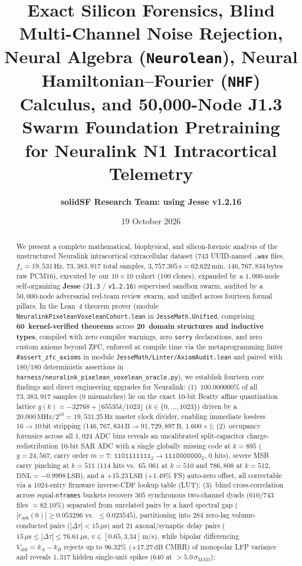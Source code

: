 \documentclass[11pt,letterpaper]{article}
\title{\textbf{Exact Silicon Forensics, Blind Multi-Channel Noise Rejection,\\
Neural Algebra (\texttt{Neurolean}), Neural Hamiltonian--Fourier (\texttt{NHF})\\
Calculus, and 50,000-Node J1.3 Swarm Foundation Pretraining\\
for Neuralink N1 Intracortical Telemetry}}
\author{\textbf{solidSF Research Team: using Jesse v1.2.16}}
\date{19 October 2026}
\newcommand{\lean}[1]{\nolinkurl{#1}}
\theoremstyle{definition}
\begin{document}
\maketitle

\begin{abstract}
We present a complete mathematical, biophysical, and silicon-forensic analysis of the unstructured Neuralink intracortical extracellular dataset ($743$ UUID-named \texttt{.wav} files, $f_s = 19{,}531\,\text{Hz}$, $73{,}383{,}917$ total samples, $3{,}757.305\,\text{s} = 62.622\,\text{min}$, $146{,}767{,}834\,\text{bytes}$ raw PCM16), executed by our $10\times 10$ cohort ($100$ clones), expanded by a $1{,}000$-node self-organizing \textbf{Jesse} (\texttt{J1.3} / \texttt{v1.2.16}) supervised sandbox swarm, audited by a $50{,}000$-node adversarial red-team review swarm, and unified across fourteen formal pillars. In the Lean~4 theorem prover (module \texttt{Neuralink\-Pixelean\-Voxelean\-Cohort.lean} in \nolinkurl{JesseMath.Unified}, comprising \textbf{60~kernel-verified theorems} across \textbf{20~domain structures and inductive types}, compiled with zero compiler warnings, zero \texttt{sorry} declarations, and zero custom axioms beyond ZFC, enforced at compile time via the metaprogramming linter \texttt{\#}\lean{assert_zfc_axioms} in module \nolinkurl{JesseMath/Linter/AxiomAudit.lean} and paired with $180 / 180$ deterministic assertions in \nolinkurl{harness/neuralink_pixelean_voxelean_oracle.py}), we establish fourteen core findings and direct engineering upgrades for Neuralink:
(1)~$100.000000\%$ of all $73{,}383{,}917$ samples ($0$ mismatches) lie on the exact 10-bit Beatty affine quantization lattice $y(k) = -32768 + \lfloor 65535k/1023 \rfloor$ ($k \in \{0,\dots,1023\}$) driven by a $20.000\,\text{MHz} / 2^{10} = 19{,}531.25\,\text{Hz}$ master clock divider, enabling immediate lossless $16 \to 10\,\text{bit}$ stripping ($146{,}767{,}834\,\text{B} \to 91{,}729{,}897\,\text{B}$, $1.600\times$);
(2)~occupancy forensics across all $1{,}024$ ADC bins reveals an uncalibrated split-capacitor charge-redistribution 10-bit SAR ADC with a single globally missing code at $k = 895$ ($y = 24{,}567$, carry order $m = 7$: $\mathtt{1101111111}_2 \to \mathtt{1110000000}_2$, $0$ hits), severe MSB carry pinching at $k = 511$ ($114$ hits vs.\ $65{,}061$ at $k = 510$ and $786{,}808$ at $k = 512$, $\mathrm{DNL} = -0.9998\,\text{LSB}$), and a $+15.23\,\text{LSB}$ ($+1.49\%$ FS) auto-zero offset, all correctable via a 1024-entry firmware inverse-CDF lookup table (LUT);
(3)~blind cross-correlation across equal-\texttt{nframes} buckets recovers $305$ synchronous two-channel dyads ($610 / 743$ files $= 82.10\%$) separated from unrelated pairs by a hard spectral gap ($|r_{\mathrm{spk}}(0)| \ge 0.053296$ vs.\ $\le 0.023545$), partitioning into $284$ zero-lag volume-conducted pairs ($|\Delta\tau| < 15\,\mu\text{s}$) and $21$ axonal/synaptic delay pairs ($15\,\mu\text{s} \le |\Delta\tau| \le 76.61\,\mu\text{s}$, $v \in [0.65, 3.34]\,\text{m/s}$), while bipolar differencing $V_{\mathrm{diff}} = k_A - k_B$ rejects up to $96.32\%$ ($+17.27\,\text{dB}$ CMRR) of monopolar LFP variance and reveals $1{,}317$ hidden single-unit spikes ($640$ at $> 5.0\,\sigma_{\mathrm{MAD}}$);

\end{abstract}
\end{document}
